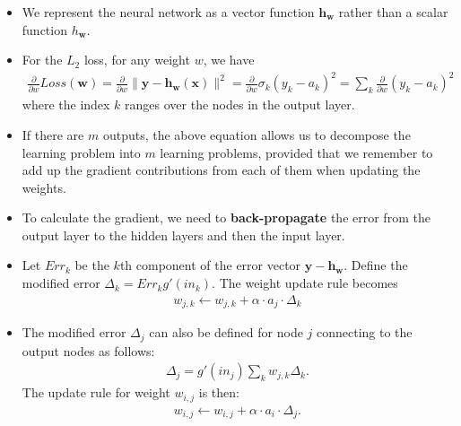 \documentclass[10pt]{article}
\newcommand{\ve}[1]{\mathbf{#1}}
\begin{document}
\begin{itemize}
    \item We represent the neural network as a vector function
        $\ve{h}_\ve{w}$ rather than a scalar function $h_\ve{w}$.
        
    \item For the $L_2$ loss, for any weight $w$, we have
        \begin{align*}
            \frac{\partial}{\partial w} Loss(\ve{w})
            = \frac{\partial}{\partial w} \|\ve{y} - \ve{h}_\ve{w}(\ve{x})\|^2
            = \frac{\partial}{\partial w} \sigma_k(y_k - a_k)^2
            = \sum_k \frac{\partial}{\partial w}(y_k - a_k)^2
        \end{align*}
        where the index $k$ ranges over the nodes in 
        the output layer.
        
    \item If there are $m$ outputs, the above equation allows 
        us to decompose the learning problem into $m$ learning
        problems, provided that we remember to add up the gradient
        contributions from each of them when updating the weights.
        
    \item To calculate the gradient, we need to 
        {\bf back-propagate} the error from the output
        layer to the hidden layers and then the input layer.
        
    \item Let $Err_k$ be the $k$th component of the error vector
        $\ve{y} - \ve{h}_\ve{w}.$ Define the modified error 
        $\Delta_k = Err_k g'(in_k)$. The weight update rule
        becomes
        \begin{align*}
            w_{j,k} \gets w_{j,k} + \alpha \cdot a_j \cdot \Delta_k
        \end{align*}
        
    \item The modified error $\Delta_j$ can also be defined
        for node $j$ connecting to the output nodes as follows:
        \begin{align*}
            \Delta_j = g'(in_j) \sum_k w_{j,k} \Delta_k.
        \end{align*}
        The update rule for weight $w_{i,j}$ is then:
        \begin{align*}
            w_{i,j} \gets w_{i,j} + \alpha \cdot a_i \cdot \Delta_{j}.
        \end{align*}
    

\end{itemize}
\end{document}
